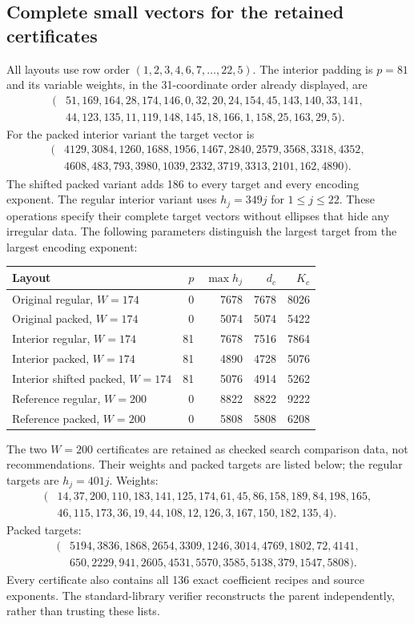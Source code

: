 \subsection{Complete small vectors for the retained certificates}
All layouts use row order $(1,2,3,4,6,7,\ldots,22,5)$. The interior
padding is $p=81$ and its variable weights, in the 31-coordinate order
already displayed, are
\[
\begin{split}
(&51,169,164,28,174,146,0,32,20,24,154,45,143,140,33,141,\\
 &44,123,135,11,119,148,145,18,166,1,158,25,163,29,5).
\end{split}
\]
For the packed interior variant the target vector is
\[
\begin{split}
(&4129,3084,1260,1688,1956,1467,2840,2579,3568,3318,4352,\\
 &4608,483,793,3980,1039,2332,3719,3313,2101,162,4890).
\end{split}
\]
The shifted packed variant adds 186 to every target and every encoding
exponent. The regular interior variant uses $h_j=349j$ for $1\le j\le22$.
These operations specify their complete target vectors without ellipses
that hide any irregular data. The following parameters distinguish the
largest target from the largest encoding exponent:
\begin{center}\small
\begin{tabular}{lrrrr}
\toprule
Layout & $p$ & $\max h_j$ & $d_c$ & $K_c$\\\midrule
Original regular, $W=174$ &0&7678&7678&8026\\
Original packed, $W=174$ &0&5074&5074&5422\\
Interior regular, $W=174$ &81&7678&7516&7864\\
Interior packed, $W=174$ &81&4890&4728&5076\\
Interior shifted packed, $W=174$ &81&5076&4914&5262\\
Reference regular, $W=200$ &0&8822&8822&9222\\
Reference packed, $W=200$ &0&5808&5808&6208\\\bottomrule
\end{tabular}
\end{center}
The two $W=200$ certificates are retained as checked search comparison data,
not recommendations. Their weights and packed targets are listed below;
the regular targets are $h_j=401j$.
Weights:
\[\begin{split}
(&14,37,200,110,183,141,125,174,61,45,86,158,189,84,198,165,\\
&46,115,173,36,19,44,108,12,126,3,167,150,182,135,4).
\end{split}\]
Packed targets:
\[\begin{split}
(&5194,3836,1868,2654,3309,1246,3014,4769,1802,72,4141,\\
&650,2229,941,2605,4531,5570,3585,5138,379,1547,5808).
\end{split}\]
Every certificate also contains all 136 exact coefficient recipes and source exponents. The standard-library verifier reconstructs the parent independently, rather than trusting these lists.
